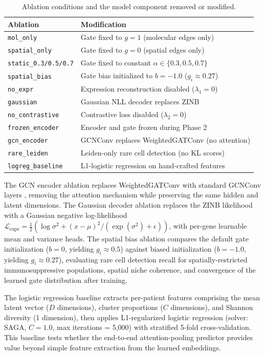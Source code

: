 \documentclass{article}
\begin{document}
\begin{table}[H]
\centering
\caption{Ablation conditions and the model component removed or modified.}
\label{tab:ablations}
\begin{tabular}{ll}
\toprule
Ablation & Modification \\
\midrule
\texttt{mol\_only} & Gate fixed to $g = 1$ (molecular edges only) \\
\texttt{spatial\_only} & Gate fixed to $g = 0$ (spatial edges only) \\
\texttt{static\_0.3/0.5/0.7} & Gate fixed to constant $\alpha \in \{0.3, 0.5, 0.7\}$ \\
\texttt{spatial\_bias} & Gate bias initialized to $b = -1.0$ ($g_i \approx 0.27$) \\
\texttt{no\_expr} & Expression reconstruction disabled ($\lambda_1 = 0$) \\
\texttt{gaussian} & Gaussian NLL decoder replaces ZINB \\
\texttt{no\_contrastive} & Contrastive loss disabled ($\lambda_2 = 0$) \\
\texttt{frozen\_encoder} & Encoder and gate frozen during Phase 2 \\
\texttt{gcn\_encoder} & GCNConv replaces WeightedGATConv (no attention) \\
\texttt{rare\_leiden} & Leiden-only rare cell detection (no KL scores) \\
\texttt{logreg\_baseline} & L1-logistic regression on hand-crafted features \\
\bottomrule
\end{tabular}
\end{table}

The GCN encoder ablation replaces WeightedGATConv with standard GCNConv layers \citep{kipf2016semi}, removing the attention mechanism while preserving the same hidden and latent dimensions. The Gaussian decoder ablation replaces the ZINB likelihood with a Gaussian negative log-likelihood $\mathcal{L}_{\text{expr}} = \frac{1}{2}(\log\sigma^2 + (x - \mu)^2 / (\exp(\sigma^2) + \epsilon))$, with per-gene learnable mean and variance heads. The spatial bias ablation compares the default gate initialization ($b = 0$, yielding $g_i \approx 0.5$) against biased initialization ($b = -1.0$, yielding $g_i \approx 0.27$), evaluating rare cell detection recall for spatially-restricted immunosuppressive populations, spatial niche coherence, and convergence of the learned gate distribution after training.

The logistic regression baseline extracts per-patient features comprising the mean latent vector ($D$ dimensions), cluster proportions ($C$ dimensions), and Shannon diversity (1 dimension), then applies L1-regularized logistic regression (solver: SAGA, $C = 1.0$, max iterations = 5,000) with stratified 5-fold cross-validation. This baseline tests whether the end-to-end attention-pooling predictor provides value beyond simple feature extraction from the learned embeddings.
\end{document}
